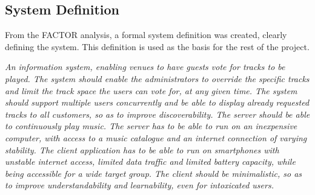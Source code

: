 \newpage
\subsection{System Definition}\label{sub:systemDefinition}
From the FACTOR analysis, a formal system definition was created,
clearly defining the system. This definition is used as the basis for
the rest of the project.

\begin{center}
\textit{An information system, enabling venues to have guests vote for tracks to be played. The system should enable the administrators to override the specific tracks and limit the track space the users can vote for, at any given time. The system should support multiple users concurrently and be able to display already requested tracks to all customers, so as to improve discoverability. The server should be able to continuously play music. The server has to be able to run on an inexpensive computer, with access to a music catalogue and an internet connection of varying stability. The client application has to be able to run on smartphones with unstable internet access, limited data traffic and limited battery capacity, while being accessible for a wide target group. The client should be minimalistic, so as to improve understandability and learnability, even for intoxicated users.}
\end{center}
